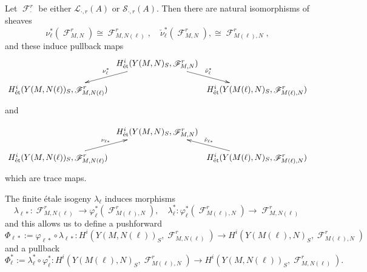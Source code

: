 \documentclass[10pt,letterpaper]{amsart}
\theoremstyle{plain}
\theoremstyle{definition}
\theoremstyle{definition}
\theoremstyle{plain}
\theoremstyle{plain}
\theoremstyle{plain}
\theoremstyle{remark}
\numberwithin{equation}{section}
\DeclareMathOperator{\et}{\acute{e}t}
\DeclareMathOperator{\F}{\mathscr{F}}
\begin{document}
Let $\F_{\cdot}^r$ be either $\mathscr{L}_{\cdot,r}(A)$ or $\mathscr{S}_{\cdot,r}(A)$. %
Then there are natural isomorphisms of sheaves
\begin{equation*}
    \nu_\ell^{*}(\F_{M,N}^r)\cong \F_{M,N(\ell)}^r,\quad\check{\nu}_\ell^{*}(\F_{M,N}^r),\cong \F_{M(\ell),N}^r,
\end{equation*}
and these induce pullback maps
\begin{equation*}
\xymatrixrowsep{0.18in}
\xymatrixcolsep{0.06in}
  \xymatrix{
& H^i_{\et}(Y(M,N)_S,\F_{M,N}^r) \ar[dl]_{\nu_{\ell}^{*}} \ar[dr]^{\check{\nu}_{\ell}^{*}} & \\
H^i_{\et}(Y(M,N({\ell}))_S,\F_{M,N({\ell})}^r) &  & H^i_{\et}(Y(M({\ell}),N)_S,\F_{M({\ell}),N}^r) }
\end{equation*}
and

\begin{equation*}
\xymatrixrowsep{0.18in}
\xymatrixcolsep{0.06in}
  \xymatrix{
& H^i_{\et}(Y(M,N)_S,\F_{M,N}^r) & \\
H^i_{\et}(Y(M,N({\ell}))_S,\F_{M,N({\ell})}^r)\ar[ur]^{\nu_{{\ell}*}} &  & \ar[ul]_{\check{\nu}_{{\ell}*}} H^i_{\et}(Y(M({\ell}),N)_S,\F_{M({\ell}),N}^r) }
\end{equation*}
which are trace maps.

The finite \'etale isogeny $\lambda_\ell$ induces morphisms
\begin{equation*}
    \lambda_{\ell*}:\F_{M,N(\ell)}^r\rightarrow \varphi_{\ell}^{*}(\F_{M(\ell),N}^r),\quad  \lambda_{\ell}^{*}:\varphi_{\ell}^{*}(\F_{M(\ell),N}^r) \rightarrow \F_{M,N(\ell)}^r
\end{equation*}
and this allows us to define a pushforward 
\begin{equation*}
    \Phi_{\ell*}:=\varphi_{\ell*}\circ\lambda_{\ell*}: H^i_{\et}(Y(M,N(\ell))_S,\F_{M,N(\ell)}^r)\rightarrow H^i_{\et}(Y(M(\ell),N)_S,\F_{M(\ell),N}^r)
\end{equation*}
and a pullback
\begin{equation*}
\Phi_{\ell}^{*}:=\lambda_{\ell}^{*}\circ\varphi_{\ell}^{*}:H^i_{\et}(Y(M(\ell),N)_S,\F_{M(\ell),N}^r)\rightarrow H^i_{\et}(Y(M,N(\ell))_S,\F_{M,N(\ell)}^r).
\end{equation*}
\end{document}
